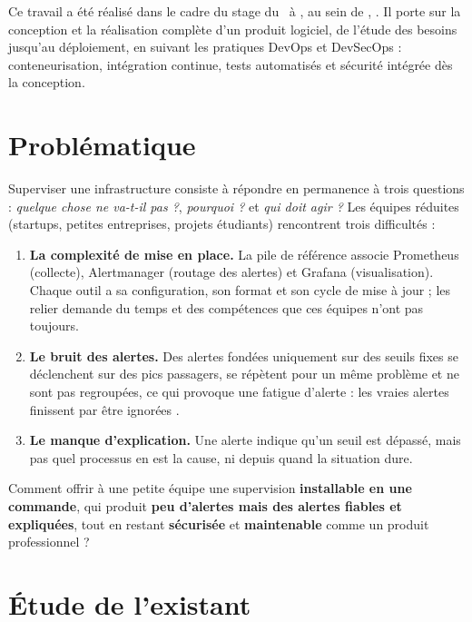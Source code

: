 Ce travail a été réalisé dans le cadre du stage du \diplome\ à \ecole, au sein de
\entreprise, \periodeStage. Il porte sur la conception et la réalisation complète d'un produit
logiciel, de l'étude des besoins jusqu'au déploiement, en suivant les pratiques DevOps et
DevSecOps : conteneurisation, intégration continue, tests automatisés et sécurité intégrée
dès la conception.

\section{Problématique}

Superviser une infrastructure consiste à répondre en permanence à trois questions :
\emph{quelque chose ne va-t-il pas ?}, \emph{pourquoi ?} et \emph{qui doit agir ?}
Les équipes réduites (startups, petites entreprises, projets étudiants) rencontrent trois
difficultés :

\begin{enumerate}
  \item \textbf{La complexité de mise en place.} La pile de référence associe Prometheus
        (collecte), Alertmanager (routage des alertes) et Grafana (visualisation). Chaque outil
        a sa configuration, son format et son cycle de mise à jour ; les relier demande du
        temps et des compétences que ces équipes n'ont pas toujours.
  \item \textbf{Le bruit des alertes.} Des alertes fondées uniquement sur des seuils fixes se
        déclenchent sur des pics passagers, se répètent pour un même problème et ne sont pas
        regroupées, ce qui provoque une \og fatigue d'alerte \fg{} : les vraies alertes finissent
        par être ignorées \cite{googlesre}.
  \item \textbf{Le manque d'explication.} Une alerte indique qu'un seuil est dépassé, mais
        pas quel processus en est la cause, ni depuis quand la situation dure.
\end{enumerate}

\begin{aretenir}[Problématique]
Comment offrir à une petite équipe une supervision \textbf{installable en une commande}, qui
produit \textbf{peu d'alertes mais des alertes fiables et expliquées}, tout en restant
\textbf{sécurisée} et \textbf{maintenable} comme un produit professionnel ?
\end{aretenir}

\section{Étude de l'existant}

